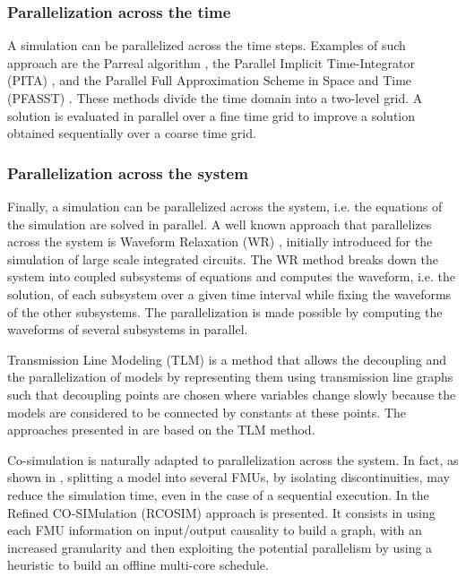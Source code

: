 \subsubsection{Parallelization across the time}

A simulation can be parallelized across the time steps. Examples of such approach are the Parreal algorithm \cite{lions:2001}, the Parallel Implicit Time-Integrator (PITA) \cite{farhat:2003}, and the Parallel Full Approximation Scheme in Space and Time (PFASST) \cite{emmett:2012}. These methods divide the time domain into a two-level grid. A solution is evaluated in parallel over a fine time grid to improve a solution obtained sequentially over a coarse time grid.
\subsubsection{Parallelization across the system}

Finally, a simulation can be parallelized across the system, i.e. the equations of the simulation are solved in parallel. A well known approach that parallelizes across the system is Waveform Relaxation (WR) \cite{lelarasmee:1982}, initially introduced for the simulation of large scale integrated circuits. The WR method breaks down the system into coupled subsystems of equations and computes the waveform, i.e. the solution, of each subsystem over a given time interval while fixing the waveforms of the other subsystems. The parallelization is made possible by computing the waveforms of several subsystems in parallel. 

Transmission Line Modeling (TLM) \cite{hui:1990} is a method that allows the decoupling and the parallelization of models by representing them using transmission line graphs such that decoupling points are chosen where variables change slowly because the models are considered to be connected by constants at these points. The approaches presented in \cite{sjolund:2010,braun:2012} are based on the TLM method. 

Co-simulation is naturally adapted to parallelization across the system. In fact, as shown in \cite{Benkhaled_A_2012_ECOSM}, splitting a model into several FMUs, by isolating discontinuities, may reduce the simulation time, even in the case of a sequential execution. In \cite{benkhaled:2014} the Refined CO-SIMulation (RCOSIM) approach is presented. It consists in using each FMU information on input/output causality to build a graph, with an increased granularity and then exploiting the potential parallelism by using a heuristic to build an offline multi-core schedule.

